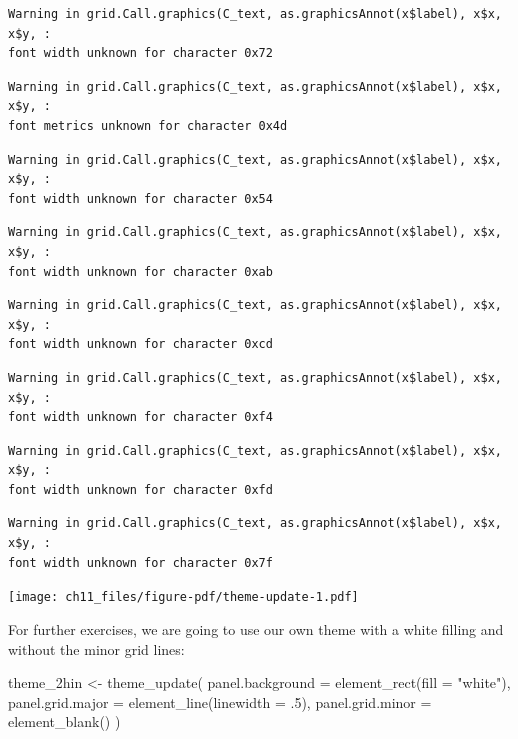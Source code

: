 \documentclass[
  letterpaper,
  DIV=11,
  numbers=noendperiod]{scrreprt}
\newenvironment{Shaded}{\begin{snugshade}}{\end{snugshade}}
\newcommand{\AttributeTok}[1]{\textcolor[rgb]{0.40,0.45,0.13}{#1}}
\newcommand{\DecValTok}[1]{\textcolor[rgb]{0.68,0.00,0.00}{#1}}
\newcommand{\FunctionTok}[1]{\textcolor[rgb]{0.28,0.35,0.67}{#1}}
\newcommand{\NormalTok}[1]{\textcolor[rgb]{0.00,0.23,0.31}{#1}}
\newcommand{\OtherTok}[1]{\textcolor[rgb]{0.00,0.23,0.31}{#1}}
\newcommand{\StringTok}[1]{\textcolor[rgb]{0.13,0.47,0.30}{#1}}
\begin{document}
\begin{verbatim}
Warning in grid.Call.graphics(C_text, as.graphicsAnnot(x$label), x$x, x$y, :
font width unknown for character 0x72
\end{verbatim}

\begin{verbatim}
Warning in grid.Call.graphics(C_text, as.graphicsAnnot(x$label), x$x, x$y, :
font metrics unknown for character 0x4d
\end{verbatim}

\begin{verbatim}
Warning in grid.Call.graphics(C_text, as.graphicsAnnot(x$label), x$x, x$y, :
font width unknown for character 0x54
\end{verbatim}

\begin{verbatim}
Warning in grid.Call.graphics(C_text, as.graphicsAnnot(x$label), x$x, x$y, :
font width unknown for character 0xab
\end{verbatim}

\begin{verbatim}
Warning in grid.Call.graphics(C_text, as.graphicsAnnot(x$label), x$x, x$y, :
font width unknown for character 0xcd
\end{verbatim}

\begin{verbatim}
Warning in grid.Call.graphics(C_text, as.graphicsAnnot(x$label), x$x, x$y, :
font width unknown for character 0xf4
\end{verbatim}

\begin{verbatim}
Warning in grid.Call.graphics(C_text, as.graphicsAnnot(x$label), x$x, x$y, :
font width unknown for character 0xfd
\end{verbatim}

\begin{verbatim}
Warning in grid.Call.graphics(C_text, as.graphicsAnnot(x$label), x$x, x$y, :
font width unknown for character 0x7f
\end{verbatim}

\texttt{[image: ch11\_files/figure-pdf/theme-update-1.pdf]}

For further exercises, we are going to use our own theme with a white
filling and without the minor grid lines:

\begin{Shaded}
\begin{Highlighting}[]
\NormalTok{theme\_2hin }\OtherTok{\textless{}{-}} \FunctionTok{theme\_update}\NormalTok{(}
  \AttributeTok{panel.background =} \FunctionTok{element\_rect}\NormalTok{(}\AttributeTok{fill =} \StringTok{"white"}\NormalTok{),}
  \AttributeTok{panel.grid.major =} \FunctionTok{element\_line}\NormalTok{(}\AttributeTok{linewidth =}\NormalTok{ .}\DecValTok{5}\NormalTok{),}
  \AttributeTok{panel.grid.minor =} \FunctionTok{element\_blank}\NormalTok{()}
\NormalTok{)}
\end{Highlighting}
\end{Shaded}
\end{document}
